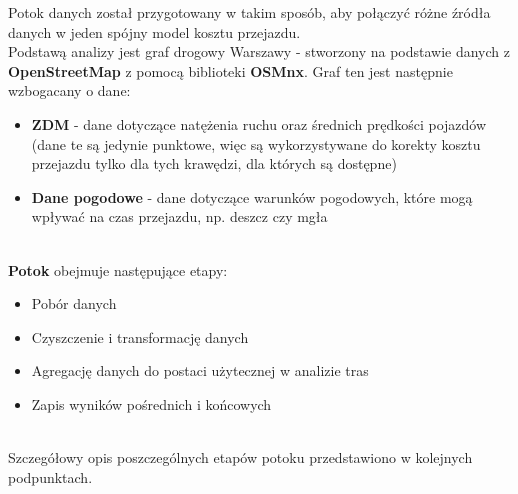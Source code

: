 \documentclass[12pt]{article}
\begin{document}
\noindent Potok danych został przygotowany w takim sposób, aby połączyć różne źródła danych w jeden spójny model kosztu przejazdu.\\

\noindent Podstawą analizy jest graf drogowy Warszawy - stworzony na podstawie danych z \textbf{OpenStreetMap} z pomocą biblioteki \textbf{OSMnx}. Graf ten jest następnie wzbogacany o dane:
\begin{itemize}
    \item \textbf{ZDM} - dane dotyczące natężenia ruchu oraz średnich prędkości pojazdów (dane te są jedynie punktowe, więc są wykorzystywane do korekty kosztu przejazdu tylko dla tych krawędzi, dla których są dostępne)
    \item \textbf{Dane pogodowe} - dane dotyczące warunków pogodowych, które mogą wpływać na czas przejazdu, np. deszcz czy mgła
\end{itemize}

\noindent \\\textbf{Potok} obejmuje następujące etapy:
\begin{itemize}
    \item Pobór danych
    \item Czyszczenie i transformację danych
    \item Agregację danych do postaci użytecznej w analizie tras
    \item Zapis wyników pośrednich i końcowych
\end{itemize}

\noindent \\Szczegółowy opis poszczególnych etapów potoku przedstawiono w kolejnych podpunktach.
\end{document}
